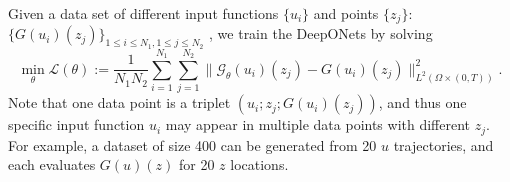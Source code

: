 \documentclass[final]{siamart171218}
\theoremstyle{remark}
\begin{document}

Given a data set of different input functions $\{u_i\}$ and points $\{z_j\}$: $\{G(u_i)(z_j)\}_{1\leq i\leq N_1, 1\leq j\leq N_2}$ , we train the DeepONets by solving
\begin{equation}\label{loss_deeponet}
\min_{\theta}\mathcal{L}(\theta):=\frac{1}{N_1N_2}\sum_{i=1}^{N_1}\sum_{j=1}^{N_2}\|\mathcal{G}_{\theta}(u_i)(z_j)-G(u_i)(z_j)\|_{L^2(\Omega\times (0,T))}^2.
\end{equation}
Note that one
data point is a triplet $(u_i; z_j; G(u_i)(z_j))$, and thus one specific input function $u_i$ may appear in multiple data points with different $z_j$. For example, a dataset of size 400 can be generated from 20 $u$ trajectories, and each evaluates $G(u)(z)$ for 20 $z$ locations.
\end{document}
